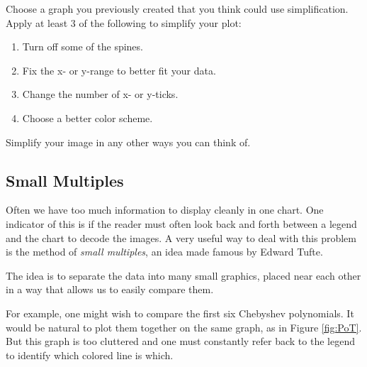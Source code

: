 \begin{problem}
Choose a graph you previously created that you think could use simplification. 
Apply at least 3 of the following to simplify your plot:
\begin{enumerate}
\item Turn off some of the spines.
\item Fix the x- or y-range to better fit your data.
\item Change the number of x- or y-ticks.
\item Choose a better color scheme.
\end{enumerate}
Simplify your image in any other ways you can think of.
\end{problem}

\subsection*{Small Multiples}

Often we have too much information to display cleanly in one chart.  One indicator of this is if the reader must often look back and forth between a legend and the chart to decode the images.  A very useful way to deal with this problem is the method of \emph{small multiples}, an idea made famous by Edward Tufte.

The idea is to separate the data into many small graphics, placed near each other in a way that allows us to easily compare them.

For example, one might wish to compare the first six Chebyshev polynomials.  It would be natural to plot them together on the same graph, as in Figure \ref{fig:PoT}.  But this graph is too cluttered and one must constantly refer back to the legend to identify which colored line is which.

